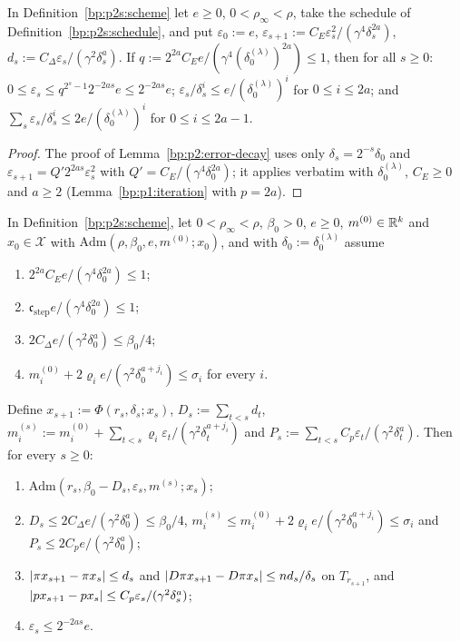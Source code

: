 \begin{lemma}\label{bp:p2s:decay}
In Definition~\ref{bp:p2s:scheme} let $e\ge0$, $0<\rho_\infty<\rho$, take the schedule of Definition~\ref{bp:p2s:schedule}, and put $\varepsilon_0:=e$,
$\varepsilon_{s+1}:=C_E\varepsilon_s^2/(\gamma^4\delta_s^{2a})$, $d_s:=C_\Delta\varepsilon_s/(\gamma^2\delta_s^a)$. If
$q:=2^{2a}C_Ee/(\gamma^4(\delta_0^{(\lambda)})^{2a})\le1$, then for all $s\ge0$: $0\le\varepsilon_s\le q^{2^s-1}2^{-2as}e\le2^{-2as}e$;
$\varepsilon_s/\delta_s^i\le e/(\delta_0^{(\lambda)})^i$ for $0\le i\le2a$; and $\sum_s\varepsilon_s/\delta_s^i\le2e/(\delta_0^{(\lambda)})^i$ for
$0\le i\le2a-1$.
\end{lemma}

\begin{proof}
\label{step:p2s:dec}
The proof of Lemma~\ref{bp:p2:error-decay} uses only $\delta_s=2^{-s}\delta_0$ and $\varepsilon_{s+1}=Q'2^{2as}\varepsilon_s^2$ with
$Q'=C_E/(\gamma^4\delta_0^{2a})$; it applies verbatim with $\delta_0^{(\lambda)}$, $C_E\ge0$ and $a\ge2$ (Lemma~\ref{bp:p1:iteration} with
$p=2a$).
\end{proof}

\begin{proposition}\label{bp:p2s:engine-iteration}
In Definition~\ref{bp:p2s:scheme}, let $0<\rho_\infty<\rho$, $\beta_0>0$, $e\ge0$, $m^{(0)}\in\mathbb{R}^k$ and $x_0\in\mathcal X$ with
$\mathrm{Adm}(\rho,\beta_0,e,m^{(0)};x_0)$, and with $\delta_0:=\delta_0^{(\lambda)}$ assume
\begin{enumerate}[label=(I\arabic*)]
\item\label{bp:p2s:I1} $2^{2a}C_Ee/(\gamma^4\delta_0^{2a})\le1$;
\item\label{bp:p2s:I2} $\mathfrak c_{\mathrm{step}}e/(\gamma^4\delta_0^{2a})\le1$;
\item\label{bp:p2s:I3} $2C_\Delta e/(\gamma^2\delta_0^a)\le\beta_0/4$;
\item\label{bp:p2s:I4} $m^{(0)}_i+2\varrho_ie/(\gamma^2\delta_0^{a+j_i})\le\sigma_i$ for every $i$.
\end{enumerate}
Define $x_{s+1}:=\Phi(r_s,\delta_s;x_s)$, $D_s:=\sum_{t<s}d_t$, $m^{(s)}_i:=m^{(0)}_i+\sum_{t<s}\varrho_i\varepsilon_t/(\gamma^2\delta_t^{a+j_i})$ and
$P_s:=\sum_{t<s}C_p\varepsilon_t/(\gamma^2\delta_t^a)$. Then for every $s\ge0$:
\begin{enumerate}[label=(\roman*)]
\item $\mathrm{Adm}(r_s,\beta_0-D_s,\varepsilon_s,m^{(s)};x_s)$;
\item $D_s\le2C_\Delta e/(\gamma^2\delta_0^a)\le\beta_0/4$, $m^{(s)}_i\le m^{(0)}_i+2\varrho_ie/(\gamma^2\delta_0^{a+j_i})\le\sigma_i$ and
  $P_s\le2C_pe/(\gamma^2\delta_0^a)$;
\item $\lvert \pi x_{s+1}-\pi x_s\rvert\le d_s$ and $\lvert D\pi x_{s+1}-D\pi x_s\rvert\le nd_s/\delta_s$ on $T_{r_{s+1}}$, and
  $\lvert px_{s+1}-px_s\rvert\le C_p\varepsilon_s/(\gamma^2\delta_s^a)$;
\item $\varepsilon_s\le2^{-2as}e$.
\end{enumerate}
\end{proposition}

